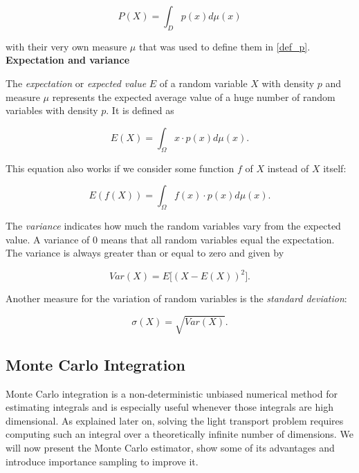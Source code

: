 \begin{equation*}
P(X) = \int_Dp(x)d\mu(x)
\end{equation*}

with their very own measure $\mu$ that was used to define them in \ref{def_p}.\\

\textbf{Expectation and variance}

The \emph{expectation} or \emph{expected value} $E$ of a random variable $X$ with density $p$ and measure $\mu$ represents the expected average value of a huge number of random variables with density $p$. It is defined as

\begin{equation*}
E(X) = \int_\Omega x \cdot p(x) d\mu(x).
\end{equation*}

This equation also works if we consider some function $f$ of $X$ instead of $X$ itself:

\begin{equation*}
E(f(X)) = \int_\Omega f(x) \cdot p(x) d\mu(x).
\end{equation*}

The \emph{variance} indicates how much the random variables vary from the expected value. A variance of $0$ means that all random variables equal the expectation. The variance is always greater than or equal to zero and given by

\begin{equation*}
Var(X) = E\lbrack(X-E(X))^2\rbrack.
\end{equation*}

Another measure for the variation of random variables is the \emph{standard deviation}:

\begin{equation*}
\sigma(X) = \sqrt{Var(X)}.
\end{equation*}

\subsection {Monte Carlo Integration}
Monte Carlo integration is a non-deterministic unbiased numerical method for estimating integrals and is especially useful whenever those integrals are high dimensional. As explained later on, solving the light transport problem requires computing such an integral over a theoretically infinite number of dimensions. We will now present the Monte Carlo estimator, show some of its advantages and introduce importance sampling to improve it.

